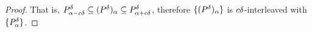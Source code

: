 \begin{proof}
  That is, $P_{\alpha-c\delta}^\delta\subseteq (\P)_\alpha\subseteq P_{\alpha + c\delta}^\delta$, therefore $\{(\P)_\alpha\}$ is $c\of$-interleaved with $\{P_\alpha^\of\}$.
%
%

\end{proof}
